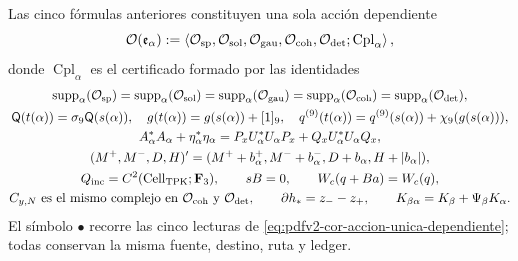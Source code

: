 Las cinco fórmulas anteriores constituyen una sola acción dependiente
\begin{equation}
\label{eq:pdfv2-cor-accion-unica-dependiente}
 \mathcal O(\mathfrak e_\alpha)
 :=\left\langle
 \mathcal O_{\rm sp},\mathcal O_{\rm sol},\mathcal O_{\rm gau},
 \mathcal O_{\rm coh},\mathcal O_{\rm det};
 \operatorname{Cpl}_\alpha
 \right\rangle,
\end{equation}
donde \(\operatorname{Cpl}_\alpha\) es el certificado formado por las
identidades
\begin{equation}
\label{eq:pdfv2-cor-acoplamientos-unicos}
 \begin{gathered}
 \operatorname{supp}_\alpha(\mathcal O_{\rm sp})
 =\operatorname{supp}_\alpha(\mathcal O_{\rm sol})
 =\operatorname{supp}_\alpha(\mathcal O_{\rm gau})
 =\operatorname{supp}_\alpha(\mathcal O_{\rm coh})
 =\operatorname{supp}_\alpha(\mathcal O_{\rm det}),\\
 \mathsf Q(t(\alpha))=\sigma_9\mathsf Q(s(\alpha)),\quad
 g(t(\alpha))=g(s(\alpha))+[1]_9,\quad
 q^{(9)}(t(\alpha))=q^{(9)}(s(\alpha))+\chi_9(g(s(\alpha))),\\
 A_\alpha^*A_\alpha+\eta_\alpha^*\eta_\alpha
 =P_xU_\alpha^*U_\alpha P_x+Q_xU_\alpha^*U_\alpha Q_x,\\
 (M^+,M^-,D,H)'=(M^++b_\alpha^+,M^-+b_\alpha^-,
 D+b_\alpha,H+|b_\alpha|),\\
 Q_{\rm inc}=C^2(\operatorname{Cell}_{\rm TPK};\mathbf F_3),\qquad
 sB=0,\qquad W_c(q+Ba)=W_c(q),\\
 C_{y,N}\text{ es el mismo complejo en }
 \mathcal O_{\rm coh}\text{ y }\mathcal O_{\rm det},\qquad
 \partial h_*=z_--z_+,\qquad
 K_{\beta\alpha}=K_\beta+\Psi_\beta K_\alpha.
 \end{gathered}
\end{equation}
El símbolo \(\bullet\) recorre las cinco lecturas de
\eqref{eq:pdfv2-cor-accion-unica-dependiente}; todas conservan la misma
fuente, destino, ruta y ledger.

